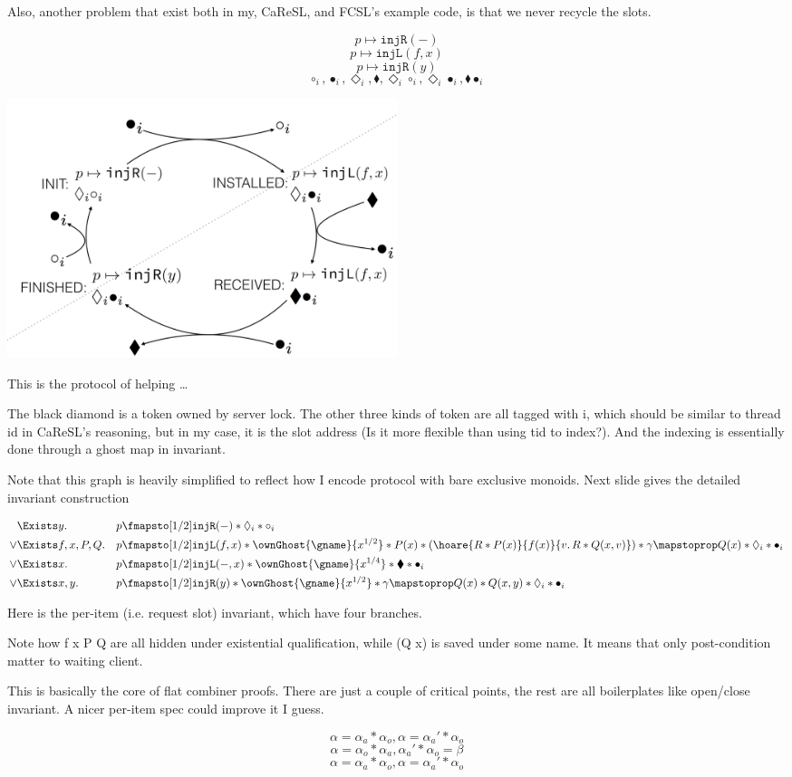 \documentclass[11pt]{article}
\newcommand{\bdia}{\blacklozenge}
\newcommand{\dia}{\Diamond}
\newcommand{\injR}{\texttt{injR}}
\newcommand{\injL}{\texttt{injL}}
\begin{document}
Also, another problem that exist both in my, CaReSL, and FCSL’s example code, is that we never recycle the slots.

\[p \mapsto \injR(-)\]
\[p \mapsto \texttt{injL}(f, x)\]
\[p \mapsto \injR(y)\]
\[\circ_i, \bullet_i, \dia_i, \bdia, \dia_i \circ_i, \dia_i \bullet_i, \bdia \bullet_i\]


\includegraphics[width=0.5\textwidth]{helping}

This is the protocol of helping … 

The black diamond is a token owned by server lock.
The other three kinds of token are all tagged with i, which should be similar to thread id in CaReSL’s reasoning, but in my case, it is the slot address (Is it more flexible than using tid to index?). And the indexing is essentially done through a ghost map in invariant. 

Note that this graph is heavily simplified to reflect how I encode protocol with bare exclusive monoids. Next slide gives the detailed invariant construction


\begin{align*}
     &\Exists y.          &&p \fmapsto[1/2] \injR(-) * \dia_i * \circ_i\\
\lor &\Exists f, x, P, Q. &&p \fmapsto[1/2] \injL(f, x) * \ownGhost{\gname}{x^{1/2}} *
                           P(x) * (\hoare{R * P(x)}{f(x)}{v.\,R * Q(x, v)}) * \gamma \mapstoprop Q(x) * \dia_i * \bullet_i\\
\lor &\Exists x.          &&p \fmapsto[1/2] \injL(-, x) * \ownGhost{\gname}{x^{1/4}} * \bdia * \bullet_i\\
\lor &\Exists x, y.       &&p \fmapsto[1/2] \injR(y) * \ownGhost{\gname}{x^{1/2}} * \gamma \mapstoprop Q(x) * Q(x, y) * \dia_i * \bullet_i
\end{align*}

Here is the per-item (i.e. request slot) invariant, which have four branches.

Note how f x P Q are all hidden under existential qualification, while (Q x) is saved under some name. It means that only post-condition matter to waiting client.

This is basically the core of flat combiner proofs. There are just a couple of critical points, the rest are all boilerplates like open/close invariant. A nicer per-item spec could improve it I guess.

\[\alpha = \alpha_a * \alpha_o, \alpha = \alpha_a' * \alpha_o\]
\[\alpha = \alpha_o * \alpha_a, \alpha_a' * \alpha_o = \beta\]
\[\alpha = \alpha_a * \alpha_o, \alpha = \alpha_a' * \alpha_o\]
\end{document}
